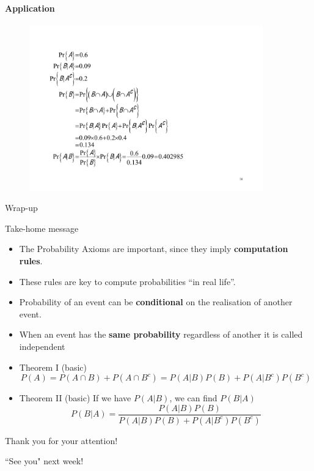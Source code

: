 \documentclass[notes=show, handout]{beamer}\usepackage[]{graphicx}\usepackage[]{color}
\begin{document}
\begin{frame}{\secname}
\framesubtitle{Application}
  \begin{example}[cont'd]
  \begin{figure}[h!]
  \centering
  \includegraphics[width=0.9\textwidth,height=0.65\textheight]{img/example9b.pdf}
  \end{figure}
  \end{example}
\end{frame}


\begin{frame}{Wrap-up}

Take-home message

\begin{itemize}
\item The Probability Axioms are important, since they imply \textbf{computation rules}.
\item These rules are key to compute probabilities ``in real life''.
\item Probability of an event can be \textbf{conditional} on the realisation of another event.
\item When an event has the \textbf{same probability} regardless of another it is called independent
\item Theorem I (basic) $$P(A)=P(A \cap B)+P(A\cap B^c) = P(A\vert B)P(B)+P(A\vert B^c) P(B^c)$$
\item Theorem II (basic) If we have $P(A|B)$, we can find $P(B|A)$
$$P(B|A) = \frac{P(A|B)P(B)}{P(A|B)P(B) + P(A|B^c)P(B^c)}$$
\end{itemize}
\end{frame}

\begin{frame}
	\begin{center}

		\LARGE{Thank you for your attention!}

		\pause

		\LARGE{``See you" next week!}
	\end{center}
\end{frame}
\end{document}
